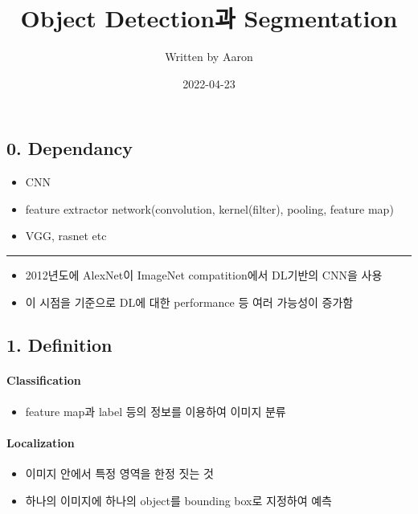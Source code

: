\documentclass[
]{article}
\title{Object Detection과 Segmentation}
\author{Written by Aaron}
\date{2022-04-23}
\providecommand{\tightlist}{%
  \setlength{\itemsep}{0pt}\setlength{\parskip}{0pt}}
\begin{document}
\maketitle

{
\setcounter{tocdepth}{2}
\tableofcontents
}
\hypertarget{dependancy}{%
\subsection{0. Dependancy}\label{dependancy}}

\begin{itemize}
\tightlist
\item
  CNN
\item
  feature extractor network(convolution, kernel(filter), pooling,
  feature map)
\item
  VGG, rasnet etc
\end{itemize}

\begin{center}\rule{0.5\linewidth}{0.5pt}\end{center}

\begin{itemize}
\tightlist
\item
  2012년도에 AlexNet이 ImageNet compatition에서 DL기반의 CNN을 사용
\item
  이 시점을 기준으로 DL에 대한 performance 등 여러 가능성이 증가함
\end{itemize}

\hypertarget{definition}{%
\subsection{1. Definition}\label{definition}}

\hypertarget{classification}{%
\paragraph{Classification}\label{classification}}

\begin{itemize}
\tightlist
\item
  feature map과 label 등의 정보를 이용하여 이미지 분류
\end{itemize}

\hypertarget{localization}{%
\paragraph{Localization}\label{localization}}

\begin{itemize}
\tightlist
\item
  이미지 안에서 특정 영역을 한정 짓는 것
\item
  하나의 이미지에 하나의 object를 bounding box로 지정하여 예측
\end{itemize}
\end{document}
